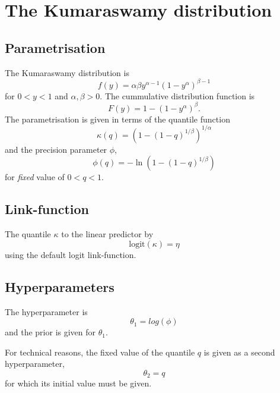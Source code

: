 \documentclass[a4paper,11pt]{article}
\begin{document}
\section*{The Kumaraswamy distribution}

\subsection*{Parametrisation}

The Kumaraswamy distribution is
\begin{displaymath}
    f(y) = \alpha \beta y^{\alpha-1}(1-y^{\alpha})^{\beta-1}
\end{displaymath}
for $0<y<1$ and $\alpha, \beta > 0$. The cummulative distribution
function is
\begin{displaymath}
    F(y) = 1-(1-y^{\alpha})^{\beta}.
\end{displaymath}
The parametrisation is given in terms of the quantile function
\begin{displaymath}
    \kappa(q) = \left(1-(1-q)^{1/\beta}\right)^{1/\alpha}
\end{displaymath}
and the precision parameter $\phi$,
\begin{displaymath}
    \phi(q) = -\ln\left(1-(1-q)^{1/\beta}\right)
\end{displaymath}
for \emph{fixed} value of $0<q<1$.

\subsection*{Link-function}

The quantile $\kappa$ to the linear predictor by
\begin{displaymath}
    \text{logit}(\kappa) = \eta
\end{displaymath}
using the default logit link-function. 

\subsection*{Hyperparameters}

The hyperparameter is
\begin{displaymath}
    \theta_1 = log(\phi)
\end{displaymath}
and the prior is given for $\theta_1$.

For technical reasons, the fixed value of the quantile $q$ is given as
a second hyperparameter,
\begin{displaymath}
    \theta_2 = q
\end{displaymath}
for which its initial value must be given. 
\end{document}
